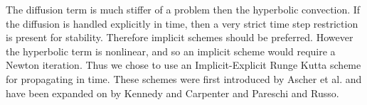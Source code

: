The diffusion term is much stiffer of a problem then the hyperbolic convection.
If the diffusion is handled explicitly in time, then a very strict time step
restriction is present for stability.
Therefore implicit schemes should be preferred.
However the hyperbolic term is nonlinear, and so an implicit scheme would require a
Newton iteration.
Thus we chose to use an Implicit-Explicit Runge Kutta scheme for propagating in time.
These schemes were first introduced by Ascher et al.\cite{article:ascher1997implicit}
and have been expanded on by Kennedy and Carpenter\cite{kennedy2003additive} and
Pareschi and Russo\cite{article:pareschi2000IMEX}.
\clearpage
\pagebreak
